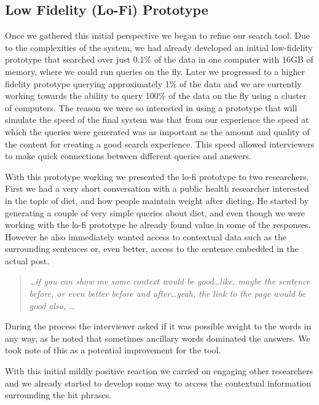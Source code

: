 \documentclass{sigchi}
\begin{document}
\subsection{Low Fidelity (Lo-Fi) Prototype}
Once we gathered this initial perspective we began to refine our search tool. Due to the complexities of the system, we had already developed an initial low-fidelity prototype that searched over just 0.1\% of the data in one computer with 16GB of memory, where we could run queries on the fly. Later we progressed to a higher fidelity prototype querying approximately 1\% of the data and we are currently working towards the ability to query 100\% of the data on the fly using a cluster of computers. The reason we were so interested in using a prototype that will simulate the speed of the final system was that from our experience the speed at which the queries were generated was as important as the amount and quality of the content for creating a good search experience. This speed allowed interviewers to make quick connections between different queries and answers.

With this prototype working we presented the lo-fi prototype to two researchers. First we had a very short conversation with a public health researcher interested in the topic of diet, and how people maintain weight after dieting. He started by generating a couple of very simple queries about diet, and even though we were working with the lo-fi prototype he already found value in some of the responses. However he also immediately wanted access to contextual data such as the surrounding sentences or, even better, access to the sentence embedded in the actual post. 

\begin{quote}
{\em
\dots if you can show me some context would be good\dots like, maybe the sentence before, or even better before and after\dots yeah, the link to the page would be good also, \dots
}\end{quote}


During the process the interviewer asked if it was possible weight to the words in any way, as he noted that sometimes ancillary words dominated the answers. We took note of this as a potential improvement for the tool.

With this initial mildly positive reaction we carried on engaging other researchers and we already started to develop some way to access the contextual information surrounding the hit phrases. 

\end{document}
